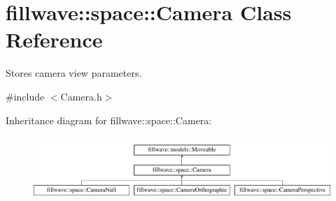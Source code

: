 \hypertarget{classfillwave_1_1space_1_1Camera}{}\section{fillwave\+:\+:space\+:\+:Camera Class Reference}
\label{classfillwave_1_1space_1_1Camera}


Stores camera view parameters.  




{\ttfamily \#include $<$Camera.\+h$>$}

Inheritance diagram for fillwave\+:\+:space\+:\+:Camera\+:\begin{figure}[H]
\begin{center}
\leavevmode
\includegraphics[height=2.456140cm]{classfillwave_1_1space_1_1Camera}
\end{center}
\end{figure}
